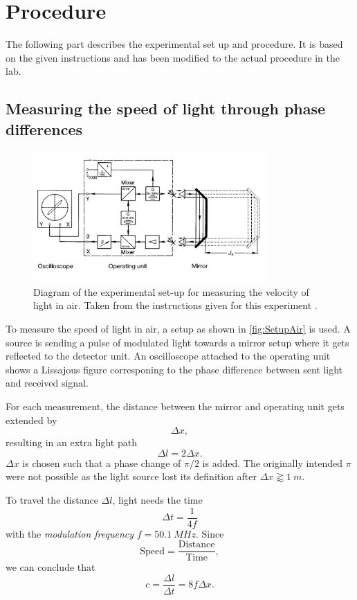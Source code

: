 \section{Procedure}
\label{sec:procedure}
The following part describes the experimental set up and procedure. It is based on the given
instructions and has been modified to the actual procedure in the lab.

\subsection{Measuring the speed of light through phase differences}
\label{sec:measuring}
\begin{figure}
    \centering
    \includegraphics[width=0.8\textwidth]{media/Setup Air.png}
    \caption{Diagram of the experimental set-up for measuring the velocity of light in air. Taken
      from the instructions given for this experiment \cite{LabInstructions}.}
    \label{fig:SetupAir}
\end{figure}
To measure the speed of light in air, a setup as shown in \autoref{fig:SetupAir} is used. A source
is sending a pulse of modulated light towards a mirror setup where it gets
reflected to the detector unit. An oscilloscope attached to the operating unit shows a Lissajous
figure corresponing to the phase difference between sent light and received signal.

For each measurement, the distance between the mirror and operating unit gets extended by
\[
\Delta x,
\]
resulting in an extra light path
\[
  \Delta l = 2 \Delta x.
\]
$\Delta x$ is chosen such that a phase change of $\pi / 2$ is added. The originally intended $\pi$
were not possible as the light source lost its definition after $\Delta x \gtrapprox \SI{1}{m}$.

To travel the distance $\Delta l$, light needs the time
\[
  \Delta t = \frac{1}{4f}
\]
with the \textit{modulation frequency} $f = \SI{50.1}{MHz}$. Since
\[
  \text{Speed} = \frac{\text{Distance}}{\text{Time}},
\]
we can conclude that
\begin{equation}
  c = \frac{\Delta l}{\Delta t} = 8f \Delta x.
  \label{eqn:speedoflight}
\end{equation}

